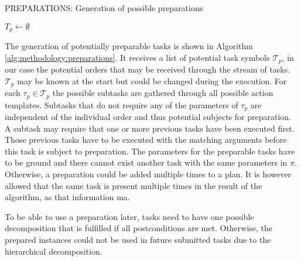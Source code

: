 \begin{algorithm}
    \caption{PREPARATIONS: Generation of possible preparations}
    \label{alg:methodology:preparations}
    $T_p \leftarrow \emptyset$\;
\end{algorithm}

The generation of potentially preparable tasks is shown in Algorithm \ref{alg:methodology:preparations}.
It receives a list of potential task symbols $\mathcal{T}_p$, in our case the potential orders that may be received through the stream of tasks.
$\mathcal{T}_p$ may be known at the start but could be changed during the execution.
For each $\tau_p \in \mathcal{T}_p$ the possible subtasks are gathered through all possible action templates.
Subtasks that do not require any of the parameters of $\tau_p$ are independent of the individual order and thus potential subjects for preparation.
A subtask may require that one or more previous tasks have been executed first.
Those previous tasks have to be executed with the matching arguments before this task is subject to preparation.
The parameters for the preparable tasks have to be ground and there cannot exist another task with the same parameters in $\pi$.
Otherwise, a preparation could be added multiple times to a plan.
It is however allowed that the same task is present multiple times in the result of the algorithm, as that information ma.

To be able to use a preparation later, tasks need to have one possible decomposition that is fulfilled if all postconditions are met.
Otherwise, the prepared instances could not be used in future submitted tasks due to the hierarchical decomposition.


